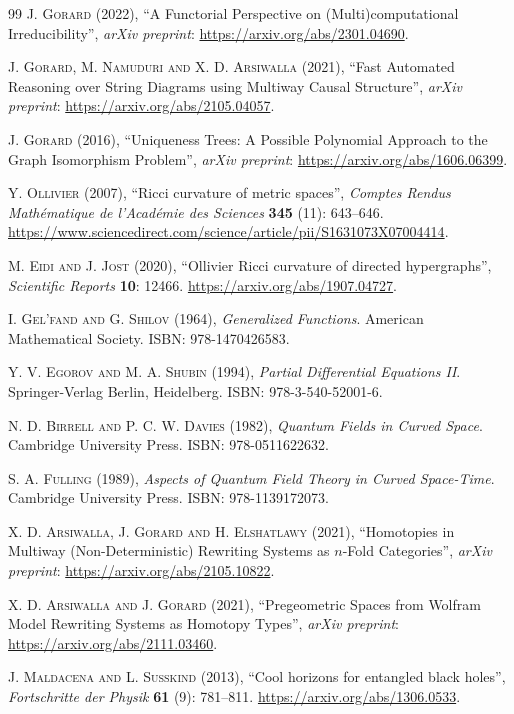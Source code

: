\documentclass{article}
\begin{document}
\begin{thebibliography}{99}
\textsc{J. Gorard} (2022), ``A Functorial Perspective on (Multi)computational Irreducibility'', \textit{arXiv preprint}: \url{https://arxiv.org/abs/2301.04690}.

\textsc{J. Gorard, M. Namuduri and X. D. Arsiwalla} (2021), ``Fast Automated Reasoning over String Diagrams using Multiway Causal Structure'', \textit{arXiv preprint}: \url{https://arxiv.org/abs/2105.04057}.

\textsc{J. Gorard} (2016), ``Uniqueness Trees: A Possible Polynomial Approach to the Graph Isomorphism Problem'', \textit{arXiv preprint}: \url{https://arxiv.org/abs/1606.06399}.

\textsc{Y. Ollivier} (2007), ``Ricci curvature of metric spaces'', \textit{Comptes Rendus Math\'ematique de l'Acad\'emie des Sciences} \textbf{345} (11): 643--646. \url{https://www.sciencedirect.com/science/article/pii/S1631073X07004414}.

\textsc{M. Eidi and J. Jost} (2020), ``Ollivier Ricci curvature of directed hypergraphs'', \textit{Scientific Reports} \textbf{10}: 12466. \url{https://arxiv.org/abs/1907.04727}.

\textsc{I. Gel'fand and G. Shilov} (1964), \textit{Generalized Functions}. American Mathematical Society. ISBN: 978-1470426583.

\textsc{Y. V. Egorov and M. A. Shubin} (1994), \textit{Partial Differential Equations II}. Springer-Verlag Berlin, Heidelberg. ISBN: 978-3-540-52001-6.

\textsc{N. D. Birrell and P. C. W. Davies} (1982), \textit{Quantum Fields in Curved Space}. Cambridge University Press. ISBN: 978-0511622632.

\textsc{S. A. Fulling} (1989), \textit{Aspects of Quantum Field Theory in Curved Space-Time}. Cambridge University Press. ISBN: 978-1139172073.

\textsc{X. D. Arsiwalla, J. Gorard and H. Elshatlawy} (2021), ``Homotopies in Multiway (Non-Deterministic) Rewriting Systems as $n$-Fold Categories'', \textit{arXiv preprint}: \url{https://arxiv.org/abs/2105.10822}.

\textsc{X. D. Arsiwalla and J. Gorard} (2021), ``Pregeometric Spaces from Wolfram Model Rewriting Systems as Homotopy Types'', \textit{arXiv preprint}: \url{https://arxiv.org/abs/2111.03460}.

\textsc{J. Maldacena and L. Susskind} (2013), ``Cool horizons for entangled black holes'', \textit{Fortschritte der Physik} \textbf{61} (9): 781--811. \url{https://arxiv.org/abs/1306.0533}.


\end{thebibliography}
\end{document}
